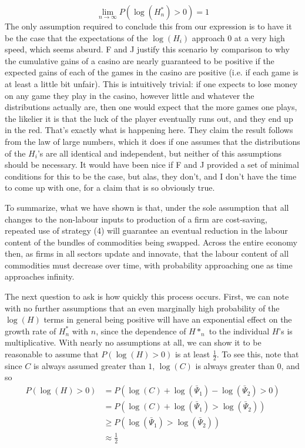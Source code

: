 \[ \lim_{n \to \infty}P(\log(H^*_n) > 0) = 1 \]
The only assumption required to conclude this from our expression is to have it be the case that the expectations of the $\log(H_i)$ approach $0$ at a very high speed, which seems absurd. F and J justify this scenario by comparison to why the cumulative gains of a casino are nearly guaranteed to be positive if the expected gains of each of the games in the casino are positive (i.e. if each game is at least a little bit unfair). This is intuitively trivial: if one expects to lose money on any game they play in the casino, however little and whatever the distributions actually are, then one would expect that the more games one plays, the likelier it is that the luck of the player eventually runs out, and they end up in the red. That's exactly what is happening here. They claim the result follows from the law of large numbers, which it does if one assumes that the distributions of the $H_i$'s are all identical and independent, but neither of this assumptions should be necessary. It would have been nice if F and J provided a set of minimal conditions for this to be the case, but alas, they don't, and I don't have the time to come up with one, for a claim that is so obviously true. \par 
To summarize, what we have shown is that, under the sole assumption that all changes to the non-labour inputs to production of a firm are cost-saving, repeated use of strategy (4) will guarantee an eventual reduction in the labour content of the bundles of commodities being swapped. Across the entire economy then, as firms in all sectors update and innovate, that the labour content of all commodities must decrease over time, with probability approaching one as time approaches infinity. \par 
The next question to ask is how quickly this process occurs. First, we can note with no further assumptions that an even marginally high probability of the $\log(H)$ terms in general being positive will have an exponential effect on the growth rate of $H^*_n$ with $n$, since the dependence of $H*_n$ to the individual $H$'s is multiplicative. With nearly no assumptions at all, we can show it to be reasonable to assume that $P(\log(H) > 0)$ is at least $\frac{1}{2}$. To see this, note that since $C$ is always assumed greater than $1$, $\log(C)$ is always greater than $0$, and so
\begin{align}
	P(\log(H) > 0) &= P(\log(C)+\log(\bar{\Psi}_1) - \log(\bar{\Psi}_2) > 0) \\
				   &= P(\log(C) + \log(\bar{\Psi}_1) > \log(\bar{\Psi}_2)) \\
				   &\geq P(\log(\bar{\Psi}_1) > \log(\bar{\Psi}_2)) \\
				   &\approx \frac{1}{2}
\end{align} 
